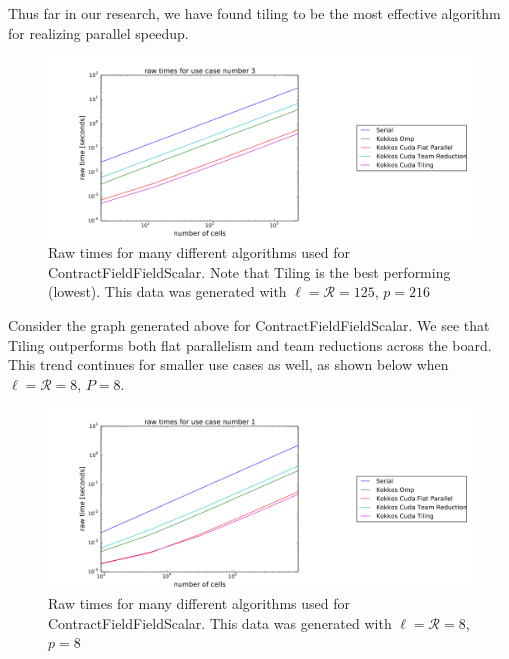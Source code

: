 Thus far in our research, we have found tiling to be the most effective
algorithm for realizing parallel speedup. 

\begin{figure}[H]
    \centering
\includegraphics[scale = .2]{tilinguc1}
\caption{Raw times for many different algorithms used for ContractFieldFieldScalar. Note that Tiling is the best performing (lowest). This data was generated with $\ell=\mathcal{R}=125$, $p=216$}
\end{figure}
Consider the graph generated above for ContractFieldFieldScalar. We see that Tiling outperforms both flat parallelism and team reductions across the board. This trend continues for smaller use cases as well, as shown below when $\ell = \mathcal{R} = 8$, $P = 8$.

\begin{figure}[H]
    \centering
\includegraphics[scale = .2]{tilinguc2}
\caption{Raw times for many different algorithms used for ContractFieldFieldScalar. This data was generated with $\ell=\mathcal{R}=8$, $p=8$}
\end{figure}

